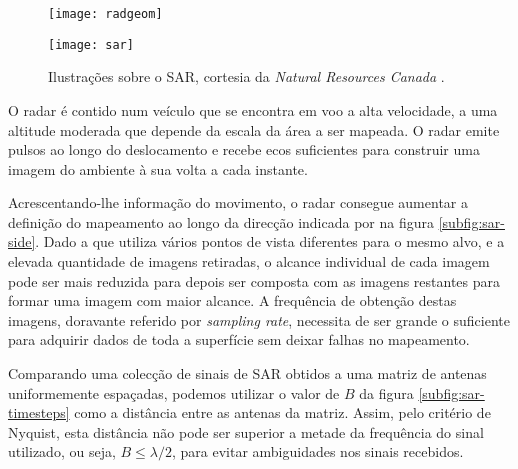 \documentclass[purist,portuguese]{ist-report}
\begin{document}
\begin{figure}[ht]
	\centering
	\hspace*{\fill}
	\begin{minipage}[t]{0.43\textwidth}
		\centering
		\texttt{[image: radgeom]}
		\label{subfig:sar-side}
	\end{minipage}
	\hfill
	\begin{minipage}[t]{0.43\textwidth}
		\centering
		\texttt{[image: sar]}
		\label{subfig:sar-timesteps}
	\end{minipage}
	\hspace*{\fill}
	\caption{Ilustrações sobre o SAR, cortesia da \textit{Natural Resources Canada} \cite{nrcan}.}
	\label{fig:nrcan}
\end{figure}

O radar é contido num veículo que se encontra em voo a alta velocidade, a uma altitude moderada que depende da escala da área a ser mapeada. O radar emite pulsos ao longo do deslocamento e recebe ecos suficientes para construir uma imagem do ambiente à sua volta a cada instante.

Acrescentando-lhe informação do movimento, o radar consegue aumentar a definição do mapeamento ao longo da direcção indicada por  na figura \ref{subfig:sar-side}. Dado a que utiliza vários pontos de vista diferentes para o mesmo alvo, e a elevada quantidade de imagens retiradas, o alcance individual de cada imagem pode ser mais reduzida para depois ser composta com as imagens restantes para formar uma imagem com maior alcance. A frequência de obtenção destas imagens, doravante referido por \textit{sampling rate}, necessita de ser grande o suficiente para adquirir dados de toda a superfície sem deixar falhas no mapeamento.

Comparando uma colecção de sinais de SAR obtidos a uma matriz de antenas uniformemente espaçadas, podemos utilizar o valor de $B$ da figura \ref{subfig:sar-timesteps} como a distância entre as antenas da matriz. Assim, pelo critério de Nyquist, esta distância não pode ser superior a metade da frequência do sinal utilizado, ou seja, $B \leq \lambda/ 2$, para evitar ambiguidades nos sinais recebidos.
\end{document}
